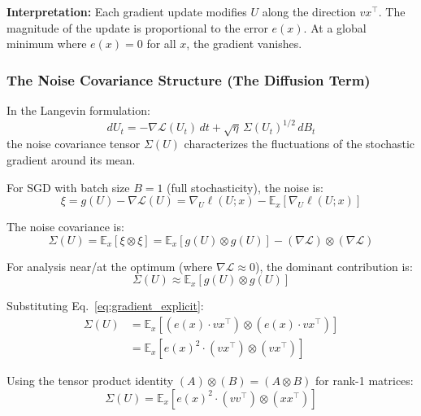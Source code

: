 \documentclass[
  journal=largetwo,
  simfonts=false,
  year=2025,
  volume=37,
]{cup-journal}
\begin{document}
\textbf{Interpretation:} Each gradient update modifies $U$ along the direction $v x^\top$. The magnitude of the update is proportional to the error $e(x)$. At a global minimum where $e(x) = 0$ for all $x$, the gradient vanishes.

\subsubsection{The Noise Covariance Structure (The Diffusion Term)}

In the Langevin formulation:
\begin{equation}
    dU_t = -\nabla \mathcal{L}(U_t) \, dt + \sqrt{\eta} \, \Sigma(U_t)^{1/2} \, dB_t
\end{equation}
the noise covariance tensor $\Sigma(U)$ characterizes the fluctuations of the stochastic gradient around its mean.

For SGD with batch size $B=1$ (full stochasticity), the noise is:
\begin{equation}
    \xi = g(U) - \nabla \mathcal{L}(U) = \nabla_U \ell(U; x) - \mathbb{E}_x[\nabla_U \ell(U; x)]
\end{equation}

The noise covariance is:
\begin{equation}
    \Sigma(U) = \mathbb{E}_x[\xi \otimes \xi] = \mathbb{E}_x[g(U) \otimes g(U)] - (\nabla \mathcal{L}) \otimes (\nabla \mathcal{L})
\end{equation}

For analysis near/at the optimum (where $\nabla \mathcal{L} \approx 0$), the dominant contribution is:
\begin{equation}
    \Sigma(U) \approx \mathbb{E}_x[g(U) \otimes g(U)]
\end{equation}

Substituting Eq.~\eqref{eq:gradient_explicit}:
\begin{align}
    \Sigma(U) &= \mathbb{E}_x \left[ \left( e(x) \cdot v x^\top \right) \otimes \left( e(x) \cdot v x^\top \right) \right] \nonumber \\
    &= \mathbb{E}_x \left[ e(x)^2 \cdot (v x^\top) \otimes (v x^\top) \right]
\end{align}

Using the tensor product identity $(A) \otimes (B) = (A \otimes B)$ for rank-1 matrices:
\begin{equation}\label{eq:sigma_tensor}
    \boxed{\Sigma(U) = \mathbb{E}_x \left[ e(x)^2 \cdot (v v^\top) \otimes (x x^\top) \right]}
\end{equation}
\end{document}

